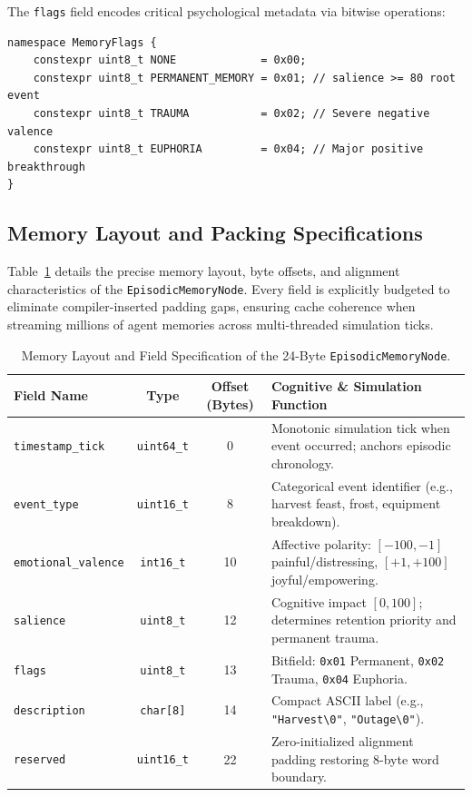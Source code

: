 The \texttt{flags} field encodes critical psychological metadata via bitwise operations:
\begin{verbatim}
namespace MemoryFlags {
    constexpr uint8_t NONE             = 0x00;
    constexpr uint8_t PERMANENT_MEMORY = 0x01; // salience >= 80 root event
    constexpr uint8_t TRAUMA           = 0x02; // Severe negative valence
    constexpr uint8_t EUPHORIA         = 0x04; // Major positive breakthrough
}
\end{verbatim}

\subsection{Memory Layout and Packing Specifications}
Table~\ref{tab:episodic_memory_layout} details the precise memory layout, byte offsets, and alignment characteristics of the \texttt{EpisodicMemoryNode}. Every field is explicitly budgeted to eliminate compiler-inserted padding gaps, ensuring cache coherence when streaming millions of agent memories across multi-threaded simulation ticks.

\begin{table}[htbp]
\centering
\small
\begin{tabular}{|l|c|c|p{}|}
\hline
\textbf{Field Name} & \textbf{Type} & \textbf{Offset (Bytes)} & \textbf{Cognitive \& Simulation Function} \\
\hline
\texttt{timestamp\_tick} & \texttt{uint64\_t} & 0 & Monotonic simulation tick when event occurred; anchors episodic chronology. \\
\hline
\texttt{event\_type} & \texttt{uint16\_t} & 8 & Categorical event identifier (e.g., harvest feast, frost, equipment breakdown). \\
\hline
\texttt{emotional\_valence} & \texttt{int16\_t} & 10 & Affective polarity: $[-100, -1]$ painful/distressing, $[+1, +100]$ joyful/empowering. \\
\hline
\texttt{salience} & \texttt{uint8\_t} & 12 & Cognitive impact $[0, 100]$; determines retention priority and permanent trauma. \\
\hline
\texttt{flags} & \texttt{uint8\_t} & 13 & Bitfield: \texttt{0x01} Permanent, \texttt{0x02} Trauma, \texttt{0x04} Euphoria. \\
\hline
\texttt{description} & \texttt{char[8]} & 14 & Compact ASCII label (e.g., \texttt{"Harvest\textbackslash 0"}, \texttt{"Outage\textbackslash 0"}). \\
\hline
\texttt{reserved} & \texttt{uint16\_t} & 22 & Zero-initialized alignment padding restoring 8-byte word boundary. \\
\hline
\end{tabular}
\caption{Memory Layout and Field Specification of the 24-Byte \texttt{EpisodicMemoryNode}.}
\label{tab:episodic_memory_layout}
\end{table}

